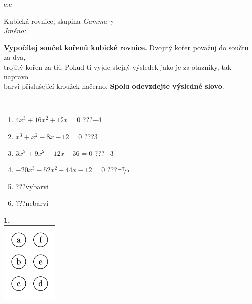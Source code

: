 \documentclass[10pt]{report}
\begin{document}
\begin{tabular}{c:c}
\begin{minipage}[c][104.5mm][t]{0.5\linewidth}
\begin{center}
\vspace{7mm}
{\huge Kubická rovnice, skupina \textit{Gamma $\gamma$} -}\\[5mm]
\textit{Jméno:}\phantom{xxxxxxxxxxxxxxxxxxxxxxxxxxxxxxxxxxxxxxxxxxxxxxxxxxxxxxxxxxxxxxxxx}\\[5mm]
\begin{minipage}{0.95\linewidth}
\begin{center}
\textbf{Vypočítej součet kořenů kubické rovnice.} Dvojitý kořen považuj do součtu za dva,\\trojitý kořen za tři. Pokud ti vyjde stejný výsledek jako je za otazníky, tak napravo\\barvi příslušející kroužek načerno. \textbf{Spolu odevzdejte výsledné slovo}.
\end{center}
\end{minipage}
\\[1mm]
\begin{minipage}{0.79\linewidth}
\begin{center}
\begin{varwidth}{\linewidth}
\begin{enumerate}
\Large
\item $4x^3+16x^2+12x=0$\quad \dotfill\; ???\;\dotfill \quad $-4$
\item $x^3+x^2-8x-12=0$\quad \dotfill\; ???\;\dotfill \quad $3$
\item $3x^3+9x^2-12x-36=0$\quad \dotfill\; ???\;\dotfill \quad $-3$
\item $-20x^3-52x^2-44x-12=0$\quad \dotfill\; ???\;\dotfill \quad $\nicefrac{-7}{5}$
\item \quad \dotfill\; ???\;\dotfill \quad vybarvi
\item \quad \dotfill\; ???\;\dotfill \quad nebarvi
\end{enumerate}
\end{varwidth}
\end{center}
\end{minipage}
\begin{minipage}{0.20\linewidth}
\begin{center}
{\Huge\bfseries 1.} \\[2mm]
\includegraphics[height=40mm]{../images/braille.png}

\end{center}
\end{minipage}
\end{center}
\end{minipage}
\end{tabular}
\end{document}
